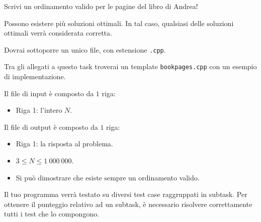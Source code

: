 Scrivi un ordinamento valido per le pagine del libro di Andrea!

\begin{warning}
    Possono esistere più soluzioni ottimali. In tal caso, qualsiasi delle soluzioni ottimali verrà considerata corretta.
\end{warning}

\Implementation

Dovrai sottoporre un unico file, con estensione \texttt{.cpp}.

\begin{warning}
    Tra gli allegati a questo task troverai un template \texttt{bookpages.cpp} con un esempio di implementazione.
\end{warning}

Il file di input è composto da $1$ riga:
\begin{itemize}
    \item Riga 1: l'intero $N$.
\end{itemize}

Il file di output è composto da $1$ riga:
\begin{itemize}
    \item Riga 1: la risposta al problema.
\end{itemize}


\Constraints

\begin{itemize}[nolistsep, itemsep=2mm]
    \item $3 \le N \le 1\:000\:000$.
    \item Si può dimostrare che esiste sempre un ordinamento valido.
\end{itemize}


\Scoring

Il tuo programma verrà testato su diversi test case raggruppati in subtask.
Per ottenere il punteggio relativo ad un subtask,
è necessario risolvere correttamente tutti i test che lo compongono.



